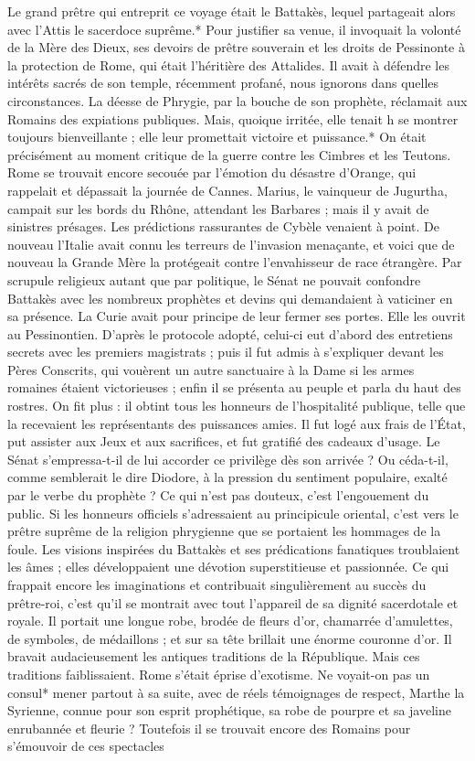 \documentclass[a4paper, 11pt, oneside, polutonikogreek, french]{article}
\begin{document}
Le grand prêtre qui entreprit ce voyage était le Battakès, lequel partageait alors avec l'Attis le sacerdoce suprême.* Pour justifier sa venue, il invoquait la volonté de la Mère des Dieux, ses devoirs de prêtre souverain et les droits de Pessinonte à la protection de Rome, qui était l'héritière des Attalides. Il avait à défendre les intérêts sacrés de son temple, récemment profané, nous ignorons dans quelles circonstances. La déesse de Phrygie, par la bouche de son prophète, réclamait aux Romains des expiations publiques. Mais, quoique irritée, elle tenait h se montrer toujours bienveillante ; elle leur promettait victoire et puissance.* On était précisément au moment critique de la guerre contre les Cimbres et les Teutons. Rome se trouvait encore secouée par l'émotion du désastre d'Orange, qui rappelait et dépassait la journée de Cannes. Marius, le vainqueur de Jugurtha, campait sur les bords du Rhône, attendant les Barbares ; mais il y avait de sinistres présages. Les prédictions rassurantes de Cybèle venaient à point. De nouveau l'Italie avait connu les terreurs de l'invasion menaçante, et voici que de nouveau la Grande Mère la protégeait contre l'envahisseur de race étrangère. Par scrupule religieux autant que par politique, le Sénat ne pouvait confondre Battakès avec les nombreux prophètes et devins qui demandaient à vaticiner en sa présence. La Curie avait pour principe de leur fermer ses portes. Elle les ouvrit au Pessinontien. D'après le protocole adopté, celui-ci eut d'abord des entretiens secrets avec les premiers magistrats ; puis il fut admis à s'expliquer devant les Pères Conscrits, qui vouèrent un autre sanctuaire à la Dame si les armes romaines étaient victorieuses ; enfin il se présenta au peuple et parla du haut des rostres. On fit plus : il obtint tous les honneurs de l'hospitalité publique, telle que la recevaient les représentants des puissances amies. Il fut logé aux frais de l'État, put assister aux Jeux et aux sacrifices, et fut gratifié des cadeaux d'usage. Le Sénat s'empressa-t-il de lui accorder ce privilège dès son arrivée ? Ou céda-t-il, comme semblerait le dire Diodore, à la pression du sentiment populaire, exalté par le verbe du prophète ? Ce qui n'est pas douteux, c'est l'engouement du public. Si les honneurs officiels s'adressaient au principicule oriental, c'est vers le prêtre suprême de la religion phrygienne que se portaient les hommages de la foule. Les visions inspirées du Battakès et ses prédications fanatiques troublaient les âmes ; elles développaient une dévotion superstitieuse et passionnée. Ce qui frappait encore les imaginations et contribuait singulièrement au succès du prêtre-roi, c'est qu'il se montrait avec tout l'appareil de sa dignité sacerdotale et royale. Il portait une longue robe, brodée de fleurs d'or, chamarrée d'amulettes, de symboles, de médaillons ; et sur sa tête brillait une énorme couronne d'or. Il bravait audacieusement les antiques traditions de la République. Mais ces traditions faiblissaient. Rome s'était éprise d'exotisme. Ne voyait-on pas un consul* mener partout à sa suite, avec de réels témoignages de respect, Marthe la Syrienne, connue pour son esprit prophétique, sa robe de pourpre et sa javeline enrubannée et fleurie ? Toutefois il se trouvait encore des Romains pour s'émouvoir de ces spectacles 
\end{document}

